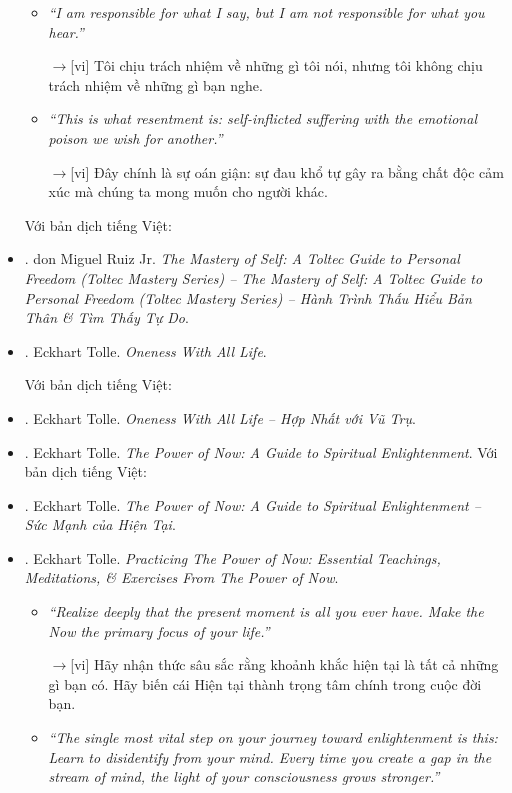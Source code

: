 \documentclass[12pt,twoside]{book}
\begin{document}
\begin{itemize}
\begin{itemize}
		\item {\it``I am responsible for what I say, but I am not responsible for what you hear.''}
		
		{\sf[en]$\to$[vi]} Tôi chịu trách nhiệm về những gì tôi nói, nhưng tôi không chịu trách nhiệm về những gì bạn nghe.
		
		\item {\it``This is what resentment is: self-inflicted suffering with the emotional poison we wish for another.''}
		
		{\sf[en]$\to$[vi]} Đây chính là sự oán giận: sự đau khổ tự gây ra bằng chất độc cảm xúc mà chúng ta mong muốn cho người khác.
	\end{itemize}
	Với bản dịch tiếng Việt:
	\item \cite{Ruiz_mastery_self}. {\sc don Miguel Ruiz Jr.} {\it The Mastery of Self: A Toltec Guide to Personal Freedom (Toltec Mastery Series) -- The Mastery of Self: A Toltec Guide to Personal Freedom (Toltec Mastery Series) -- Hành Trình Thấu Hiểu Bản Thân \& Tìm Thấy Tự Do}.
	\item \cite{Tolle_oneness}. {\sc Eckhart Tolle}. {\it Oneness With All Life}.
	
	Với bản dịch tiếng Việt:
	\item \cite{Tolle_oneness_VN}. {\sc Eckhart Tolle}. {\it Oneness With All Life -- Hợp Nhất với Vũ Trụ}.
	\item \cite{Tolle_now}. {\sc Eckhart Tolle}. {\it The Power of Now: A Guide to Spiritual Enlightenment}. Với bản dịch tiếng Việt:
	\item \cite{Tolle_now_VN}. {\sc Eckhart Tolle}. {\it The Power of Now: A Guide to Spiritual Enlightenment -- Sức Mạnh của Hiện Tại}.
	\item \cite{Tolle_practice_now}. {\sc Eckhart Tolle}. {\it Practicing The Power of Now: Essential Teachings, Meditations, \& Exercises From The Power of Now}.
	\begin{itemize}
		\item {\it``Realize deeply that the present moment is all you ever have. Make the Now the primary focus of your life.''}
		
		{\sf[en]$\to$[vi]} Hãy nhận thức sâu sắc rằng khoảnh khắc hiện tại là tất cả những gì bạn có. Hãy biến cái Hiện tại thành trọng tâm chính trong cuộc đời bạn.
		
		\item {\it``The single most vital step on your journey toward enlightenment is this: Learn to disidentify from your mind. Every time you create a gap in the stream of mind, the light of your consciousness grows stronger.''}
		

\end{itemize}
\end{itemize}
\end{document}
